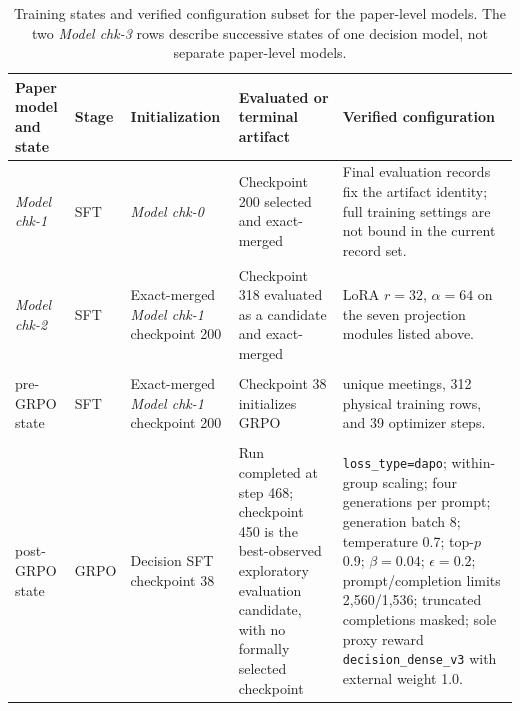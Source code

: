 \begin{table}[H]
    \centering
    \scriptsize
    \setlength{\tabcolsep}{3pt}
    \renewcommand{\arraystretch}{1.16}
    \begin{tabularx}{\textwidth}{@{}
        >{\centering\arraybackslash}p{}
        >{\centering\arraybackslash}p{}
        >{\raggedright\arraybackslash}p{}
        >{\raggedright\arraybackslash}p{}
        >{\raggedright\arraybackslash}X
    @{}}
        \toprule
        \textbf{Paper model and state} & \textbf{Stage} & \textbf{Initialization} &
        \textbf{Evaluated or terminal artifact} &
        \textbf{Verified configuration} \\
        \midrule
        \textit{Model chk-1} & SFT & \textit{Model chk-0} & Checkpoint 200 selected and
        exact-merged & Final evaluation records fix the artifact identity;
        full training settings are not bound in the current record set. \\
        \textit{Model chk-2} & SFT & Exact-merged \textit{Model chk-1} checkpoint 200 &
        Checkpoint 318 evaluated as a candidate and exact-merged & LoRA $r=32$, $\alpha=64$ on
        the seven projection modules listed above. \\
        \makecell{\textit{Model chk-3}\\pre-GRPO state} & SFT & Exact-merged \textit{Model chk-1} checkpoint 200 &
        Checkpoint 38 initializes GRPO & 211 unique meetings, 312 physical
        training rows, and 39 optimizer steps. \\
        \makecell{\textit{Model chk-3}\\post-GRPO state} & GRPO & Decision SFT checkpoint 38 & Run completed at
        step 468; checkpoint 450 is the best-observed exploratory evaluation
        candidate, with no formally selected checkpoint &
        \texttt{loss\_type=dapo}; within-group scaling; four generations per
        prompt; generation batch 8; temperature 0.7; top-$p$ 0.9;
        $\beta=0.04$; $\epsilon=0.2$; prompt/completion limits 2,560/1,536;
        truncated completions masked; sole proxy reward
        \texttt{decision\_dense\_v3} with external weight 1.0. \\
        \bottomrule
    \end{tabularx}
    \caption{Training states and verified configuration subset for the paper-level models. The two \textit{Model chk-3} rows describe successive states of one decision model, not separate paper-level models.}
    \label{tab:ch2:training_hyperparameters_archive}
\end{table}

